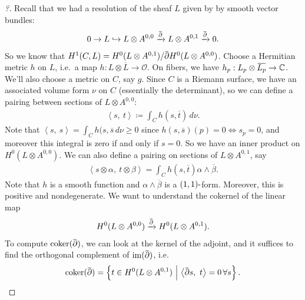 \begin{proof}[?]

Recall that we had a resolution of the sheaf \(L\) given by by smooth
vector bundles:
\begin{align*}
0 \to L \hookrightarrow L\otimes A^{0, 0} \xrightarrow{\mkern 1.5mu\overline{\mkern-1.5mu{\partial}\mkern-1.5mu}\mkern 1.5mu} L \otimes A^{0, 1} \xrightarrow{\mkern 1.5mu\overline{\mkern-1.5mu{\partial}\mkern-1.5mu}\mkern 1.5mu} 0
.\end{align*}
So we know that
\(H^1(C, L) = H^0(L\otimes A^{0, 1}) / \mkern 1.5mu\overline{\mkern-1.5mu{\partial}\mkern-1.5mu}\mkern 1.5muH^0(L\otimes A^{0, 0})\).
Choose a Hermitian metric \(h\) on \(L\), i.e.~a map
\(h: L\otimes{\overline{{L}}} \to {\mathcal{O}}\). On fibers, we have
\(h_p: L_p \otimes\mkern 1.5mu\overline{\mkern-1.5mu L_p \mkern-1.5mu}\mkern 1.5mu \to {\mathbb{C}}\).
We'll also choose a metric on \(C\), say \(g\). Since \(C\) is a Riemann
surface, we have an associated volume form \(\nu\) on \(C\) (essentially
the determinant), so we can define a pairing between sections of
\(L\otimes A^{0, 0}\):
\begin{align*}
{\left\langle {s},~{t} \right\rangle} \coloneqq\int_C h(s, {\overline{{t}}} ) \,d\nu
.\end{align*}
Note that
\({\left\langle {s},~{s} \right\rangle} = \int_C h(s, {\overline{{s}}} \,d\nu \geq 0\)
since \(h(s, {\overline{{s}}})(p) = 0 \iff s_p = 0\), and moreover this
integral is zero if and only if \(s=0\). So we have an inner product on
\(H^0(L\otimes A^{0, 0})\). We can also define a pairing on sections of
\(L\otimes A^{0, 1}\), say
\begin{align*}
{\left\langle { s \otimes \alpha},~{ t \otimes \beta} \right\rangle} = \int_C h(s, {\overline{{t}}}) \alpha\wedge {\overline{{\beta}}}
.\end{align*}
Note that \(h\) is a smooth function and
\(\alpha\wedge {\overline{{\beta}}}\) is a \((1, 1){\hbox{-}}\)form.
Moreover, this is positive and nondegenerate. We want to understand the
cokernel of the linear map
\begin{align*}
H^0(L \otimes A^{0, 0}) \xrightarrow{\mkern 1.5mu\overline{\mkern-1.5mu{\partial}\mkern-1.5mu}\mkern 1.5mu} H^0( L \otimes A^{0, 1})
.\end{align*}
To compute
\(\operatorname{coker}(\mkern 1.5mu\overline{\mkern-1.5mu{\partial}\mkern-1.5mu}\mkern 1.5mu)\),
we can look at the kernel of the adjoint, and it suffices to find the
orthogonal complement of
\(\operatorname{im}( \mkern 1.5mu\overline{\mkern-1.5mu{\partial}\mkern-1.5mu}\mkern 1.5mu)\),
i.e.~
\begin{align*}
\operatorname{coker}(\mkern 1.5mu\overline{\mkern-1.5mu{\partial}\mkern-1.5mu}\mkern 1.5mu) = \left\{{ t\in H^0(L\otimes A^{0, 1}) {~\mathrel{\Big|}~}{\left\langle {\mkern 1.5mu\overline{\mkern-1.5mu{\partial}\mkern-1.5mu}\mkern 1.5mus},~{t} \right\rangle} = 0 \, \forall s}\right\} 
.\end{align*}


\end{proof}
